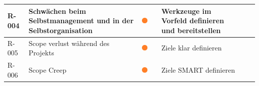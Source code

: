 \begin{table}[H]
{\begin{tabular}{lllllll}
R-004                                                                       & Schwächen beim Selbstmanagement und in der Selbstorganisation                                      & {\includegraphics[width=0.05\linewidth]{source/status_report/main/risk_warning}}                     &                         & Werkzeuge im Vorfeld definieren und bereitstellen                                                                                                              &                                                                                                                                                                 &                                                                                                                                 \\ \hline
R-005                                                                       & Scope verlust während des Projekts                                                                 & {\includegraphics[width=0.05\linewidth]{source/status_report/main/risk_warning}}                     &                         & Ziele klar definieren                                                                                                                                          &                                                                                                                                                                 &                                                                                                                                 \\ \hline
R-006                                                                       & Scope Creep                                                                                        & {\includegraphics[width=0.05\linewidth]{source/status_report/main/risk_warning}}                     &                         & Ziele SMART definieren                                                                                                                                         &                                                                                                                                                                 &                                                                                                                                 \\ \hline

\end{tabular}}
\end{table}
